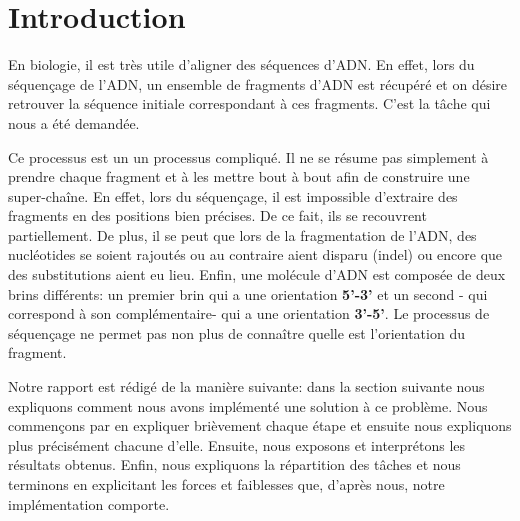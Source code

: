 
\section{Introduction}

En biologie, il est très utile d'aligner des séquences d'ADN. En effet, lors du séquençage de l'ADN, un ensemble de fragments d'ADN  est récupéré et on désire retrouver la séquence initiale correspondant à ces fragments. C'est la tâche qui nous a été demandée. 

Ce processus est un un processus compliqué. Il ne se résume pas simplement à prendre chaque fragment et à les mettre bout à bout afin de construire une super-chaîne. En effet,
lors du séquençage, il est impossible d'extraire des fragments en des positions bien précises. De ce fait, ils se recouvrent partiellement. De plus, il se peut que lors de la fragmentation de l'ADN, des nucléotides se soient rajoutés ou au contraire aient disparu (indel) ou encore que des substitutions aient eu lieu. Enfin, une molécule d'ADN est composée de deux brins différents: un premier brin qui a une orientation \textbf{5'-3'} et un second - qui correspond à son complémentaire- qui a une orientation \textbf{3'-5'}. Le processus de séquençage ne permet pas non plus de connaître quelle est l'orientation du fragment.

Notre rapport est rédigé de la manière suivante: dans la section suivante nous expliquons comment nous avons implémenté une solution à ce problème. Nous commençons par en expliquer brièvement chaque étape et ensuite nous expliquons plus précisément chacune d'elle. Ensuite, nous exposons et interprétons les résultats obtenus. Enfin, nous expliquons la répartition des tâches et nous terminons en  explicitant les forces et faiblesses que, d'après nous, notre implémentation comporte.

